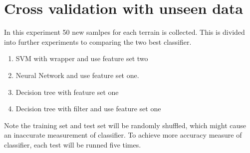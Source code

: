 \documentclass[USenglish]{ifimaster}  %
\begin{document}
\section{Cross validation with unseen data}
In this experiment 50 new samlpes for each terrain is collected. This is divided into further experiments to comparing the two best classifier.

\begin{enumerate}
\item SVM with wrapper and use feature set two
\item Neural Network and use feature set one.
\item Decision tree with feature set one
\item Decision tree with filter and use feature set one
\end{enumerate}
Note the training set and test set will be randomly shuffled, which might cause an inaccurate measurement of classifier. To achieve more accuracy measure of classifier, each test will be runned five times.
\end{document}
